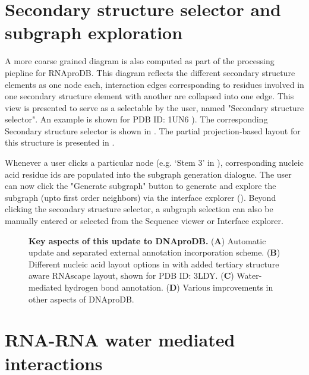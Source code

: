 \section{Secondary structure selector and subgraph exploration}

A more coarse grained diagram is also computed as part of the processing piepline for RNAproDB. This diagram reflects the different secondary structure elements as one node each, interaction edges corresponding to residues involved in one secondary structure element with another are collapsed into one edge. This view is presented to serve as a selectable by the user, named "Secondary structure selector". An example is shown for PDB ID: 1UN6 ). The corresponding Secondary structure selector is shown in . The partial projection-based layout for this structure is presented in . 

Whenever a user clicks a particular node (e.g. `Stem 3' in ), corresponding nucleic acid residue ids are populated into the subgraph generation dialogue. The user can now click the "Generate subgraph" button to generate and explore the subgraph (upto first order neighbors) via the interface explorer (). Beyond clicking the secondary structure selector, a subgraph selection can also be manually entered or selected from the Sequence viewer or Interface explorer. 

\begin{center}
    \begin{figure}
        \caption[Key aspects of this update to DNAproDB.]{\textbf{Key aspects of this update to DNAproDB.} ({\bf A}) Automatic update and separated external annotation incorporation scheme.  ({\bf B})  Different nucleic acid layout options in with added tertiary structure aware RNAscape layout, shown for PDB ID: 3LDY. ({\bf C}) Water-mediated hydrogen bond annotation. ({\bf D}) Various improvements in other aspects of DNAproDB. }
  \label{fig:rnaprodb2}
\end{figure}
\end{center}

\section{RNA-RNA water mediated interactions}

